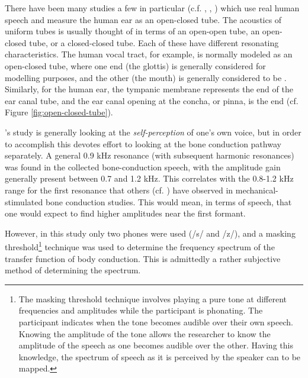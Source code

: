 There have been many studies \DIFdelbegin \DIFdel{, }\DIFdelend \DIFaddbegin {}\DIFaddend a few in particular (c.f. \cite{bekesy:48}, \cite{porschmann:00}, \cite{reinfeldt:10}) which use real human speech \DIFaddbegin {}\DIFaddend and measure the human ear as an open-closed tube.
%
The acoustics of uniform tubes is usually thought of in terms of an open-open tube, an open-closed tube, or a closed-closed tube.  Each of these have different resonating characteristics. The human vocal tract, for example, is normally modeled as an open-closed tube, where one end (the glottis) is generally considered \DIFdelbegin {}\DIFdelend \DIFaddbegin {}\DIFaddend for modelling purposes, and the other (the mouth) is generally considered to be \DIFdelbegin {}\DIFdelend \DIFaddbegin {}\DIFaddend .  Similarly, for the human ear, the tympanic membrane represents the \DIFdelbegin {}\DIFdelend \DIFaddbegin {}\DIFaddend end of the ear canal tube, and the ear canal opening at the concha, or pinna, is the \DIFdelbegin {}\DIFdelend \DIFaddbegin {}\DIFaddend end (cf. Figure \ref{fig:open-closed-tube}).

\cite{porschmann:00}'s study is generally looking at the \textit{self-perception} of one's own voice, but in order to accomplish this devotes effort to looking at the bone conduction pathway separately.  A general 0.9 kHz resonance (with subsequent harmonic resonances) was found in the collected bone-conduction speech, with the amplitude gain generally present between 0.7 and 1.2 kHz.  This correlates with the 0.8-1.2 kHz range for the first resonance that others  (cf. \cite{hakansson:94}) have observed in mechanical-stimulated bone conduction studies. This would mean, in terms of speech, that one would expect to find higher amplitudes near the first formant.

However, in this study only two phones were used (/s/ and /z/), and a masking threshold\footnote{The masking threshold technique involves playing a pure tone at different frequencies and amplitudes while the participant is phonating. The participant indicates when the tone becomes audible over their own speech. Knowing the amplitude of the tone allows the researcher to know the amplitude of the speech as one becomes audible over the other. Having this knowledge, the spectrum of speech as it is perceived by the speaker can to be mapped.} technique was used to determine the frequency spectrum of the transfer function of body conduction.  This is admittedly a rather subjective method of determining the spectrum.  

